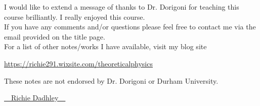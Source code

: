 \documentclass[11pt,oneside]{book}
\theoremstyle{definition} %
\theoremstyle{plain} %
\theoremstyle{remark} %
\theoremstyle{underline}
\begin{document}
I would like to extend a message of thanks to Dr. Dorigoni for teaching this course brilliantly. I really enjoyed this course. \\

If you have any comments and/or questions please feel free to contact me via the email provided on the title page. \\

For a list of other notes/works I have available, visit my blog site

\begin{center}
    \href{https://richie291.wixsite.com/theoreticalphysics}{https://richie291.wixsite.com/theoreticalphysics}
\end{center}

These notes are not endorsed by Dr. Dorigoni or Durham University.

\vspace{1cm}

\begin{flushright}
    \Huge{{\cursive\setul{0.1ex}{}\ul{~~Richie Dadhley~~}}}
\end{flushright}


\tableofcontents


\mainmatter

%











% 
% 



%
\end{document}
